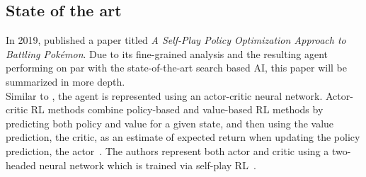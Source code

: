 \subsection{State of the art}
In 2019, \cite{Huang_Lee_2019} published a paper titled \emph{A Self-Play Policy 
Optimization Approach to Battling Pokémon}. 
Due to its fine-grained analysis and the resulting agent performing on par with the state-of-the-art search
based AI, this paper will be summarized in more depth. \\
Similar to \cite{OpenAI_dota}, the agent is represented using an actor-critic neural network.
Actor-critic RL methods
combine policy-based and value-based RL methods by predicting both policy and value for a given 
state, and then using the value prediction, the \grqq critic\grqq, as an estimate of expected
return when updating the policy prediction, the \grqq actor\grqq~\autocite{Konda_Tsitsiklis}. The authors represent both
actor and critic using a two-headed neural network which is trained via self-play RL~\autocite{Huang_Lee_2019}.

